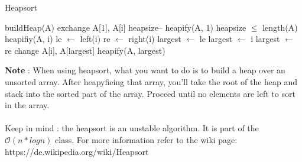 \documentclass[12pt]{article}
\begin{document}
	\begin{algorithm}
		\caption{Heapsort}
		\begin{algorithmic}
				\State buildHeap(A)
					\State exchange A[1], A[i]
					\State heapsize--
					\State heapify(A, 1)
				\EndFor
			\EndFunction
				\State heapsize $\le$ length(A)
					\State heapifiy(A, i)
				\EndFor
			\EndFunction
				\State le $\gets$ left(i)
				\State re $\gets$ right(i)
					\State largest $\gets$ le
				\Else
					\State largest $\gets$ i
				\EndIf
					\State largest $\gets$ re
				\EndIf
					\State change A[i], A[largest]
					\State heapify(A, largest)
				\EndIf
			\EndFunction
		\end{algorithmic}
	\end{algorithm}
	\textbf{Note} : When using heapsort, what you want to do is to build a heap over an unsorted array. After heapyfieing that array, you'll take the root of the heap and stack into the sorted part of the array. Proceed until no elements are left to sort in the array. \\ \\
	Keep in mind : the heapsort is an unstable algorithm. It is part of the $\mathcal{O}(n * log n)$ class. For more information refer to the wiki page: https://de.wikipedia.org/wiki/Heapsort
\end{document}
